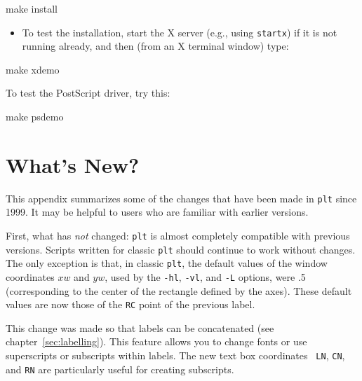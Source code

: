 \documentclass{book}
\begin{document}
\begin{center}
\begin{boxedverbatim}
make install
\end{boxedverbatim}
\end{center}

\begin{itemize}
\item
To test the installation, start the X server (e.g., using {\tt startx})
if it is not running already, and then (from an X terminal window) type:
\end{itemize}

\begin{center}
\begin{boxedverbatim}
make xdemo
\end{boxedverbatim}
\end{center}

To test the PostScript driver, try this:

\begin{center}
\begin{boxedverbatim}
make psdemo
\end{boxedverbatim}
\end{center}

\chapter{What's New? \label{sec:new}}

This appendix summarizes some of the changes that have been made in {\tt plt}
since 1999.  It may be helpful to users who are familiar with earlier versions.

%
First, what has {\em not} changed: {\tt plt} is almost completely compatible
with previous versions.  Scripts written for classic {\tt plt} should continue
to work without changes.  The only exception is that, in classic {\tt plt}, the
default values of the window coordinates $xw$ and $yw$, used by the {\tt -hl},
{\tt -vl}, and {\tt -L} options, were .5 (corresponding to the center of
the rectangle defined by the axes).  These default values are now those of the
{\tt RC} point of the previous label.

%
%
%
This change was made so that labels can be concatenated (see
chapter~\ref{sec:labelling}).  This feature allows you to change fonts or use
superscripts or subscripts within labels.  The new text box coordinates {\tt
LN}, {\tt CN}, and {\tt RN} are particularly useful for creating subscripts.
\end{document}
